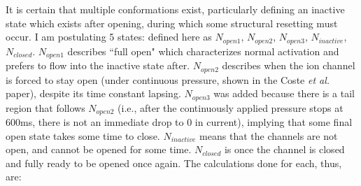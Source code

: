 \documentclass[12pt]{amsart}
\begin{document}
It is certain that multiple conformations exist, particularly defining an inactive state which exists after opening, during which some structural resetting must occur. I am postulating 5 states: defined here as $N_{open1}$, $N_{open2}$, $N_{open3}$, $N_{inactive}$, $N_{closed}$. $N_{open1}$ describes ``full open" which characterizes normal activation and prefers to flow into the inactive state after. $N_{open2}$ describes when the ion channel is forced to stay open (under continuous pressure, shown in the Coste \textit{et al.} paper), despite its time constant lapsing. $N_{open3}$ was added because there is a tail region that follows $N_{open2}$ (i.e., after the continuously applied pressure stops at 600ms, there is not an immediate drop to 0 in current), implying that some final open state takes some time to close. $N_{inactive}$ means that the channels are not open, and cannot be opened for some time. $N_{closed}$ is once the channel is closed and fully ready to be opened once again. The calculations done for each, thus, are: 

\bigskip

\begin{center}
\end{center}
\end{document}
